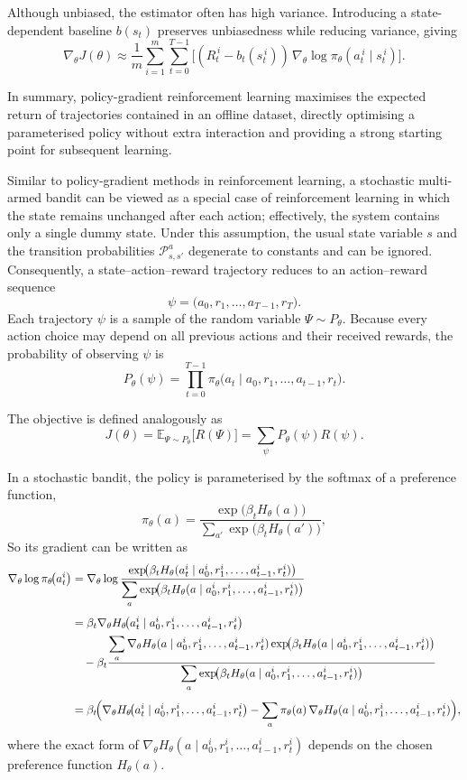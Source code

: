 Although unbiased, the estimator often has high variance.  
Introducing a state-dependent baseline $b(s_t)$ preserves unbiasedness while reducing variance, giving
\[
\nabla_{\theta}J(\theta)\approx
\frac{1}{m}\sum_{i=1}^{m}\sum_{t=0}^{T-1}
\bigl[(R_t^{\,i}-b_t(s_t^{\,i}))\,
      \nabla_{\theta}\log\pi_{\theta}(a_t^{\,i}\mid s_t^{\,i})\bigr].
\]

In summary, policy-gradient reinforcement learning maximises the expected return of trajectories contained in an offline dataset, directly optimising a parameterised policy without extra interaction and providing a strong starting point for subsequent learning.

Similar to policy-gradient methods in reinforcement learning, a stochastic multi-armed bandit can be viewed as a special case of reinforcement learning in which the state remains unchanged after each action; effectively, the system contains only a single dummy state. Under this assumption, the usual state variable $s$ and the transition probabilities $\mathcal{P}_{s,s'}^{a}$ degenerate to constants and can be ignored.  
Consequently, a state–action–reward trajectory reduces to an action–reward sequence
\[
\psi=\bigl(a_0,r_1,\dots,a_{T-1},r_T\bigr).
\]
Each trajectory $\psi$ is a sample of the random variable $\Psi\sim P_{\theta}$.  
Because every action choice may depend on all previous actions and their received rewards, the probability of observing $\psi$ is
\[
P_{\theta}(\psi)=
\prod_{t=0}^{T-1}
\pi_{\theta}\!\bigl(a_t \mid a_0,r_1,\ldots,a_{t-1},r_t\bigr).
\]

The objective is defined analogously as
\[
J(\theta)=
\mathbb{E}_{\Psi\sim P_{\theta}}\!\bigl[R(\Psi)\bigr]
=\sum_{\psi}P_{\theta}(\psi)R(\psi).
\]

In a stochastic bandit, the policy is parameterised by the softmax of a preference function,
\[
\pi_{\theta}(a)=
\frac{\exp\!\bigl(\beta_t H_{\theta}(a)\bigr)}
{\sum_{a'}\exp\!\bigl(\beta_t H_{\theta}(a')\bigr)},
\]
So its gradient can be written as
\[
\begin{aligned}
\nabla_{\theta}\log\pi_{\theta}\!\bigl(a_t^i\bigr)
&=
\nabla_{\theta}\log
\frac{\exp\!\bigl(\beta_t H_{\theta}
(a_t^i \mid a_0^i, r_1^i,\ldots,a_{t-1}^i,r_t^i)\bigr)}
{\displaystyle
\sum_{a}\exp\!\bigl(\beta_t H_{\theta}
(a \mid a_0^i, r_1^i,\ldots,a_{t-1}^i,r_t^i)\bigr)}
\\[4pt]
&=
\beta_t\nabla_{\theta}
H_{\theta}\!\bigl(a_t^i \mid a_0^i, r_1^i,\ldots,a_{t-1}^i,r_t^i\bigr)
\\
&\quad-
\beta_t\frac{\displaystyle
\sum_{a}\nabla_{\theta}H_{\theta}
(a \mid a_0^i, r_1^i,\ldots,a_{t-1}^i,r_t^i)
\exp\!\bigl(\beta_t H_{\theta}(a \mid a_0^i, r_1^i,\ldots,a_{t-1}^i,r_t^i)\bigr)}
{\displaystyle
\sum_{a}\exp\!\bigl(\beta_t H_{\theta}
(a \mid a_0^i, r_1^i,\ldots,a_{t-1}^i,r_t^i)\bigr)}
\\[4pt]
&=
\beta_t\!\Bigl(
\nabla_{\theta}H_{\theta}\!\bigl(a_t^i \mid a_0^i, r_1^i,\ldots,a_{t-1}^i,r_t^i\bigr)
-\sum_{a}\pi_{\theta}(a)\,
\nabla_{\theta}H_{\theta}
(a \mid a_0^i, r_1^i,\ldots,a_{t-1}^i,r_t^i)
\Bigr),
\end{aligned}
\]
where the exact form of
$\nabla_{\theta}H_{\theta}
(a\mid a_0^i, r_1^i,\ldots,a_{t-1}^i,r_t^i)$
depends on the chosen preference function $H_{\theta}(a)$.

